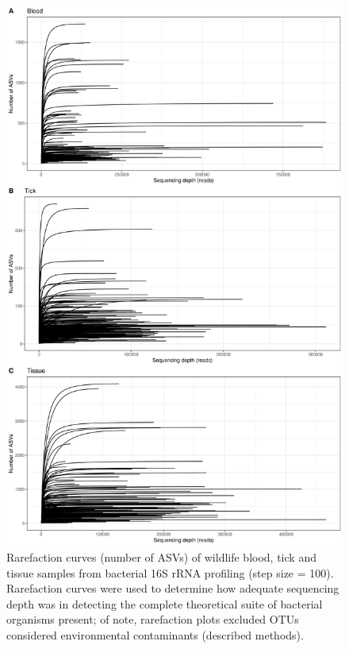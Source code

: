 \documentclass[a4paper, nobind]{templates/ociamthesis}
\begin{document}
\begin{figure}
\includegraphics[width=0.85\linewidth]{figures/ms-figs-appendix/FigA-3.2} \caption[Rarefaction curves of bacterial 16S rRNA sequencing from wildlife samples]{Rarefaction curves (number of ASVs) of wildlife blood, tick and tissue samples from bacterial 16S rRNA profiling (step size = 100). Rarefaction curves were used to determine how adequate sequencing depth was in detecting the complete theoretical suite of bacterial organisms present; of note, rarefaction plots excluded OTUs considered environmental contaminants (described methods).}\label{fig:FA32}
\end{figure}

\newpage
\end{document}
